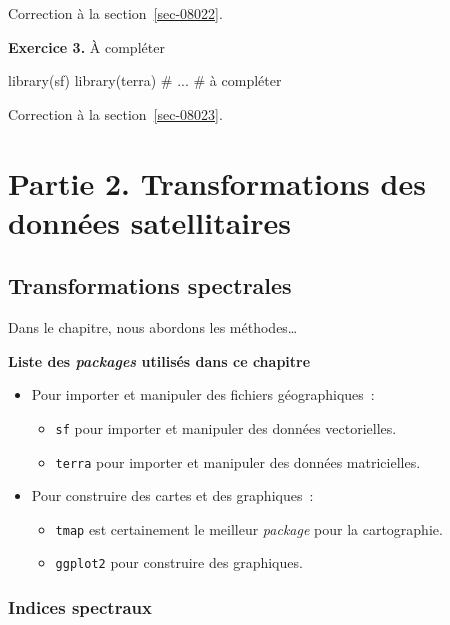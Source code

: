 \documentclass[
  letterpaper,
  DIV=11,
  numbers=noendperiod]{scrreprt}
\newenvironment{Shaded}{\begin{snugshade}}{\end{snugshade}}
\newcommand{\CommentTok}[1]{\textcolor[rgb]{0.37,0.37,0.37}{#1}}
\newcommand{\NormalTok}[1]{\textcolor[rgb]{0.00,0.23,0.31}{#1}}
\providecommand{\tightlist}{%
  \setlength{\itemsep}{0pt}\setlength{\parskip}{0pt}}\usepackage{longtable,booktabs,array}
\begin{document}
Correction à la section~\ref{sec-08022}.

\textbf{Exercice 3.} À compléter

\begin{Shaded}
\begin{Highlighting}[]
\NormalTok{library(sf)}
\NormalTok{library(terra)}
\CommentTok{\# ...}
\CommentTok{\# à compléter}
\end{Highlighting}
\end{Shaded}

Correction à la section~\ref{sec-08023}.

\part{Partie 2. Transformations des données satellitaires}


\chapter{Transformations spectrales}\label{sec-chap03}

Dans le chapitre, nous abordons les méthodes\ldots{}

\textbf{Liste des \emph{packages} utilisés dans ce chapitre}

\begin{itemize}
\tightlist
\item
  Pour importer et manipuler des fichiers géographiques~:

  \begin{itemize}
  \tightlist
  \item
    \texttt{sf} pour importer et manipuler des données vectorielles.
  \item
    \texttt{terra} pour importer et manipuler des données matricielles.
  \end{itemize}
\item
  Pour construire des cartes et des graphiques~:

  \begin{itemize}
  \tightlist
  \item
    \texttt{tmap} est certainement le meilleur \emph{package} pour la
    cartographie.
  \item
    \texttt{ggplot2} pour construire des graphiques.
  \end{itemize}
\end{itemize}

\section{Indices spectraux}\label{sec-031}
\end{document}
